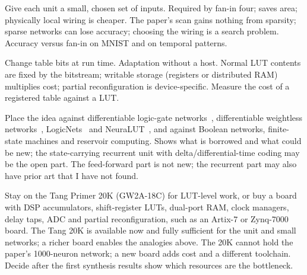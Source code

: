 {Give each unit a small, chosen set of inputs.}
{Required by fan-in four; saves area; physically local wiring is cheaper.}
{The paper's scan gains nothing from sparsity; sparse networks can lose accuracy; choosing the wiring is a search problem.}
{Accuracy versus fan-in on MNIST and on temporal patterns.}

{Change table bits at run time.}
{Adaptation without a host.}
{Normal LUT contents are fixed by the bitstream; writable storage (registers or distributed RAM) multiplies cost; partial reconfiguration is device-specific.}
{Measure the cost of a registered table against a LUT.}

{Place the idea against differentiable logic-gate networks~\cite{petersen2022}, differentiable weightless networks~\cite{bacellar2024}, LogicNets~\cite{umuroglu2020} and NeuraLUT~\cite{andronic2024}, and against Boolean networks, finite-state machines and reservoir computing.}
{Shows what is borrowed and what could be new; the state-carrying recurrent unit with delta/differential-time coding may be the open part.}
{The feed-forward part is not new; the recurrent part may also have prior art that I have not found.}
{}

{Stay on the Tang Primer 20K (GW2A-18C) for LUT-level work, or buy a board with DSP accumulators, shift-register LUTs, dual-port RAM, clock managers, delay taps, ADC and partial reconfiguration, such as an Artix-7 or Zynq-7000 board.}
{The Tang 20K is available now and fully sufficient for the unit and small networks; a richer board enables the analogies above.}
{The 20K cannot hold the paper's 1000-neuron network; a new board adds cost and a different toolchain.}
{Decide after the first synthesis results show which resources are the bottleneck.}
